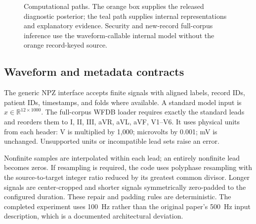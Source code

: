 \documentclass[11pt,a4paper]{article}
\begin{document}
\begin{figure}[htbp]\centering
{}
\caption{Computational paths. The orange box supplies the released diagnostic posterior; the teal path supplies internal representations and explanatory evidence. Security and new-record full-corpus inference use the waveform-callable internal model without the orange record-keyed source.}
\label{fig:architecture}\end{figure}

\subsection{Waveform and metadata contracts}
The generic NPZ interface accepts finite signals with aligned labels, record IDs, patient IDs, timestamps, and folds where available. A standard model input is $x\in\mathbb{R}^{12\times1000}$. The full-corpus WFDB loader requires exactly the standard leads and reorders them to I, II, III, aVR, aVL, aVF, V1--V6. It uses physical units from each header: V is multiplied by 1,000; microvolts by 0.001; mV is unchanged. Unsupported units or incompatible lead sets raise an error.

Nonfinite samples are interpolated within each lead; an entirely nonfinite lead becomes zeros. If resampling is required, the code uses polyphase resampling with the source-to-target integer ratio reduced by its greatest common divisor. Longer signals are center-cropped and shorter signals symmetrically zero-padded to the configured duration. These repair and padding rules are deterministic. The completed experiment uses 100~Hz rather than the original paper's 500~Hz input description, which is a documented architectural deviation.
\end{document}
